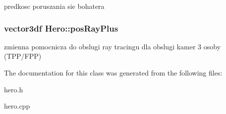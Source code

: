 \label{class_hero_aa56f0d2e5320927be5043d0f43c48c0e}
predkosc poruszania sie bohatera \hypertarget{class_hero_afac7e4e706ab911bd5d55c6afd8b43b0}{
\subsubsection[{posRayPlus}]{\setlength{\rightskip}{0pt plus 5cm}vector3df {\bf Hero::posRayPlus}}}
\label{class_hero_afac7e4e706ab911bd5d55c6afd8b43b0}
zmienna pomocnicza do obslugi ray tracingu dla obslugi kamer 3 osoby (TPP/FPP) 

The documentation for this class was generated from the following files:\begin{DoxyCompactItemize}
\item 
hero.h\item 
hero.cpp\end{DoxyCompactItemize}
